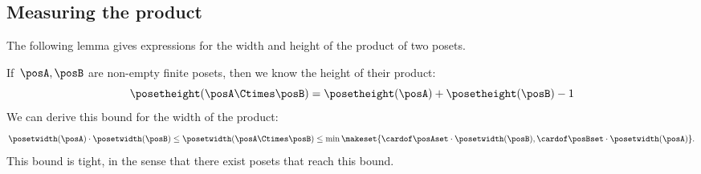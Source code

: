\subsection{Measuring the product}
The following lemma gives expressions for the width and height of the product of two posets.

\begin{widepar}
    \begin{lemma}
        \label{lem:measuring-product}
        If~$\posA,\posB$ are non-empty finite posets, then we know the height of their product:
        \begin{equation}\label{eq:bound-height}
            \posetheight(\posA\Ctimes \posB) = \posetheight(\posA)+\posetheight(\posB)-1
        \end{equation}
        We can derive this bound for the width of the product:
        \begin{equation}\label{eq:bound-width}
            \posetwidth(\posA) \cdot \posetwidth(\posB)
            \leq \posetwidth(\posA\Ctimes \posB)
            \leq \min \makeset{
                \cardof \posAset  \cdot \posetwidth(\posB),\cardof \posBset   \cdot \posetwidth(\posA)
            }.
        \end{equation}
        This bound is tight, in the sense that there exist posets that reach this bound.
    \end{lemma}
\end{widepar}

